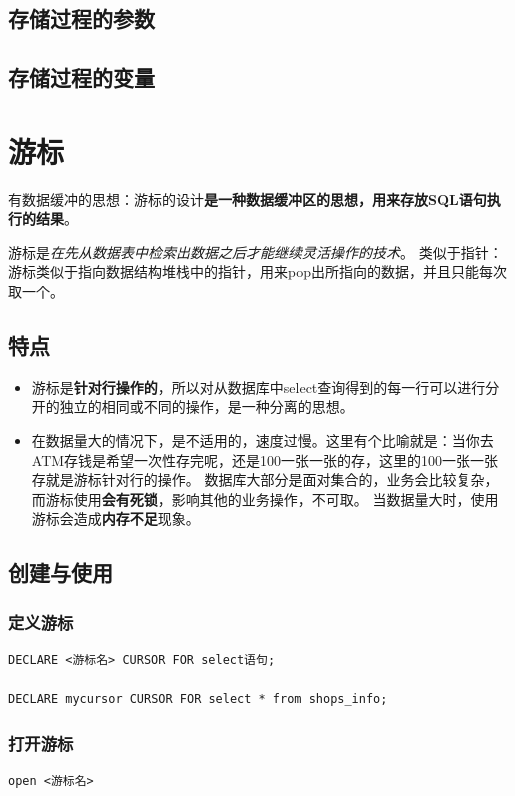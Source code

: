 \documentclass[UTF8,a4paper,12pt]{ctexbook}
\begin{document}
	\section{存储过程的参数}
	
	
	
	\section{存储过程的变量}


\chapter{游标}
	有数据缓冲的思想：游标的设计\textbf{是一种数据缓冲区的思想，用来存放SQL语句执行的结果}。 
	
	游标是\textit{在先从数据表中检索出数据之后才能继续灵活操作的技术}。 类似于指针：游标类似于指向数据结构堆栈中的指针，用来pop出所指向的数据，并且只能每次取一个。
	
	\section{特点}
		\begin{itemize}
			\item 游标是\textbf{针对行操作的}，所以对从数据库中select查询得到的每一行可以进行分开的独立的相同或不同的操作，是一种分离的思想。
			\item 在数据量大的情况下，是不适用的，速度过慢。这里有个比喻就是：当你去ATM存钱是希望一次性存完呢，还是100一张一张的存，这里的100一张一张存就是游标针对行的操作。 数据库大部分是面对集合的，业务会比较复杂，而游标使用\textbf{会有死锁}，影响其他的业务操作，不可取。 当数据量大时，使用游标会造成\textbf{内存不足}现象。
		\end{itemize}
	
	\section{创建与使用}
		\subsection{定义游标}
			\begin{lstlisting}
DECLARE <游标名> CURSOR FOR select语句;	

DECLARE mycursor CURSOR FOR select * from shops_info;	
			\end{lstlisting}
		
		\subsection{打开游标}
			\begin{lstlisting}	
open <游标名>			
			\end{lstlisting}
		
\end{document}
